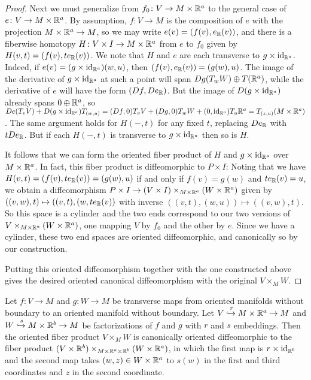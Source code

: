 \begin{proof}
	Next we must generalize from $f_0 \colon V \to M \times \mathbb{R}^a $ to the general case of $e \colon V \to M \times \mathbb{R}^a $.
	By assumption, $f \colon V \to M$ is the composition of $e$ with the projection $M \times \mathbb{R}^a \to M$, so we may write $e(v) = (f(v), e_{\mathbb{R}}(v))$, and there is a fiberwise homotopy $H \colon V \times I \to M \times \mathbb{R}^a $ from $e$ to $f_0$ given by $H(v,t) = (f(v), te_{\mathbb{R}}(v))$.
	We note that $H$ and $e$ are each transverse to $g \times \mathrm{id}_{\mathbb{R}^a }$.
	Indeed, if $e(v) = (g \times \mathrm{id}_{\mathbb{R}^a })(w,u)$, then $(f(v),e_{\mathbb{R}}(v)) = (g(w),u)$.
	The image of the derivative of $g \times \mathrm{id}_{\mathbb{R}^a }$ at such a point will span $Dg(T_wW) \oplus T(\mathbb{R}^a )$, while the derivative of $e$ will have the form $(Df,De_{\mathbb{R}})$.
	But the image of $D(g \times \mathrm{id}_{\mathbb{R}^a })$ already spans $0\oplus \mathbb{R}^a $, so $De(T_vV)+D(g \times \mathrm{id}_{\mathbb{R}^a })T_{(w,u)} = (Df,0)T_vV+(Dg,0)T_wW+(0,\mathrm{id}_{\mathbb{R}^a })T_u\mathbb{R}^a = T_{(z,u)}(M \times \mathbb{R}^a )$.
	The same argument holds for $H(-,t)$ for any fixed $t$, replacing $De_{\mathbb{R}}$ with $tDe_{\mathbb{R}}$.
	But if each $H(-,t)$ is transverse to $g \times \mathrm{id}_{\mathbb{R}^a }$ then so is $H$.

	It follows that we can form the oriented fiber product of $H$ and $g \times \mathrm{id}_{\mathbb{R}^a }$ over $M \times \mathbb{R}^a $.
	In fact, this fiber product is diffeomorphic to $P \times I$: Noting that we have $H(v,t) = (f(v),te_{\mathbb{R}}(v)) = (g(w),u)$ if and only if $f(v) = g(w)$ and $te_{\mathbb{R}}(v) = u$, we obtain a diffeomorphism $P \times I \to (V \times I)\times_{M \times \mathbb{R}^a }(W \times \mathbb{R}^a )$ given by $((v,w),t) \mapsto ((v,t),(w, te_{\mathbb{R}}(v))$ with inverse $((v,t),(w,u)) \mapsto ((v,w),t)$.
	So this space is a cylinder and the two ends correspond to our two versions of $V\times_{M \times \mathbb{R}^a } (W \times \mathbb{R}^a )$, one mapping $V$ by $f_0$ and the other by $e$.
	Since we have a cylinder, these two end spaces are oriented diffeomorphic, and canonically so by our construction.

	Putting this oriented diffeomorphism together with the one constructed above gives the desired oriented canonical diffeomorphism with the original $V \times_M W$.
\end{proof}

\begin{corollary}\label{C: oriented full transition to embedded}
	Let $f \colon V \to M$ and $g \colon W \to M$ be transverse maps from oriented manifolds without boundary to an oriented manifold without boundary.
	Let $V\xhookrightarrow{r} M \times \mathbb{R}^a \to M$ and $W\xhookrightarrow{s} M \times \mathbb{R}^b \to M$ be factorizations of $f$ and $g$ with $r$ and $s$ embeddings.
	Then the oriented fiber product $V \times_M W$ is canonically oriented diffeomorphic to the fiber product $(V \times \mathbb{R}^b )\times_{M \times \mathbb{R}^a \times \mathbb{R}^b }(W \times \mathbb{R}^a )$, in which the first map is $r \times \mathrm{id}_{\mathbb{R}^b }$ and the second map takes $(w,z) \in W \times \mathbb{R}^a $ to $s(w)$ in the first and third coordinates and $z$ in the second coordinate.
\end{corollary}

